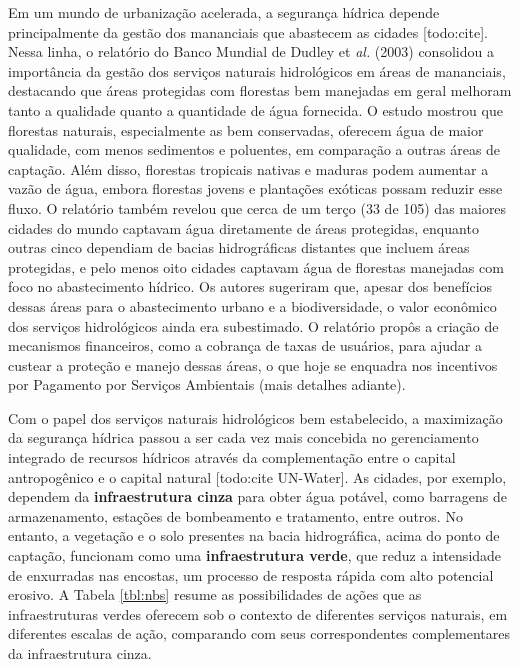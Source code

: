\documentclass[./main.tex]{subfiles}
\begin{document}
\par Em um mundo de urbanização acelerada, a segurança hídrica depende principalmente da gestão dos mananciais que abastecem as cidades [todo:cite]. Nessa linha, o relatório do Banco Mundial de Dudley et \textit{al.} (2003) \cite{Dudley2003a} consolidou a importância da gestão dos serviços naturais hidrológicos em áreas de mananciais, destacando que áreas protegidas com florestas bem manejadas em geral melhoram tanto a qualidade quanto a quantidade de água fornecida. O estudo mostrou que florestas naturais, especialmente as bem conservadas, oferecem água de maior qualidade, com menos sedimentos e poluentes, em comparação a outras áreas de captação. Além disso, florestas tropicais nativas e maduras podem aumentar a vazão de água, embora florestas jovens e plantações exóticas possam reduzir esse fluxo. O relatório também revelou que cerca de um terço (33 de 105) das maiores cidades do mundo captavam água diretamente de áreas protegidas, enquanto outras cinco dependiam de bacias hidrográficas distantes que incluem áreas protegidas, e pelo menos oito cidades captavam água de florestas manejadas com foco no abastecimento hídrico. Os autores sugeriram que, apesar dos benefícios dessas áreas para o abastecimento urbano e a biodiversidade, o valor econômico dos serviços hidrológicos ainda era subestimado. O relatório propôs a criação de mecanismos financeiros, como a cobrança de taxas de usuários, para ajudar a custear a proteção e manejo dessas áreas, o que hoje se enquadra nos incentivos por Pagamento por Serviços Ambientais (mais detalhes adiante). 

\par Com o papel dos serviços naturais hidrológicos bem estabelecido, a maximização da segurança hídrica passou a ser cada vez mais concebida no gerenciamento integrado de recursos hídricos através da complementação entre o capital antropogênico e o capital natural [todo:cite UN-Water]. As cidades, por exemplo, dependem da \textbf{infraestrutura cinza} para obter água potável, como barragens de armazenamento, estações de bombeamento e tratamento, entre outros. No entanto, a vegetação e o solo presentes na bacia hidrográfica, acima do ponto de captação, funcionam como uma \textbf{infraestrutura verde}, que reduz a intensidade de enxurradas nas encostas, um processo de resposta rápida com alto potencial erosivo. A Tabela \ref{tbl:nbs} resume as possibilidades de ações que as infraestruturas verdes oferecem sob o contexto de diferentes serviços naturais, em diferentes escalas de ação, comparando com seus correspondentes complementares da infraestrutura cinza.
\end{document}
